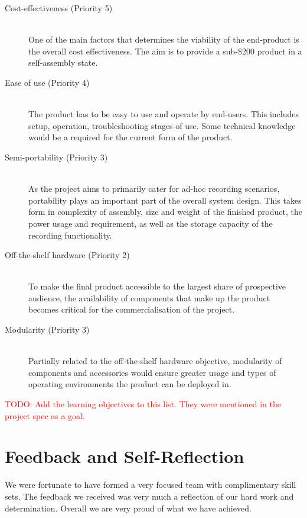 \documentclass[11pt,a4paper,titlepage]{report}
\begin{document}
\begin{description}

  \item[Cost-effectiveness (Priority 5)] \hfill \\
      One of the main factors that determines the viability of the end-product is the overall cost effectiveness. The aim is to provide a sub-\$200 product in a self-assembly state.
  \item[Ease of use (Priority 4)] \hfill \\
      The product has to be easy to use and operate by end-users. This includes setup, operation, troubleshooting stages of use. Some technical knowledge would be a required for the current form of the product.
  \item[Semi-portability (Priority 3)] \hfill \\
      As the project aims to primarily cater for ad-hoc recording scenarios, portability plays an important part of the overall system design. This takes form in complexity of assembly, size and weight of the finished product, the power usage and requirement, as well as the storage capacity of the recording functionality.
  \item[Off-the-shelf hardware (Priority 2)] \hfill \\
      To make the final product accessible to the largest share of prospective audience, the availability of components that make up the product becomes critical for the commercialisation of the project.
  \item[Modularity (Priority 3)] \hfill \\
      Partially related to the off-the-shelf hardware objective, modularity of components and accessories would ensure greater usage and types of operating environments the product can be deployed in.

\end{description}

\textcolor{red}{TODO: Add the learning objectives to this list. They were mentioned in the project spec as a goal.}


\section{Feedback and Self-Reflection}

We were fortunate to have formed a very focused team with complimentary skill sets. The feedback we received was very much a reflection of our hard work and determination. Overall we are very proud of what we have achieved.
\end{document}

